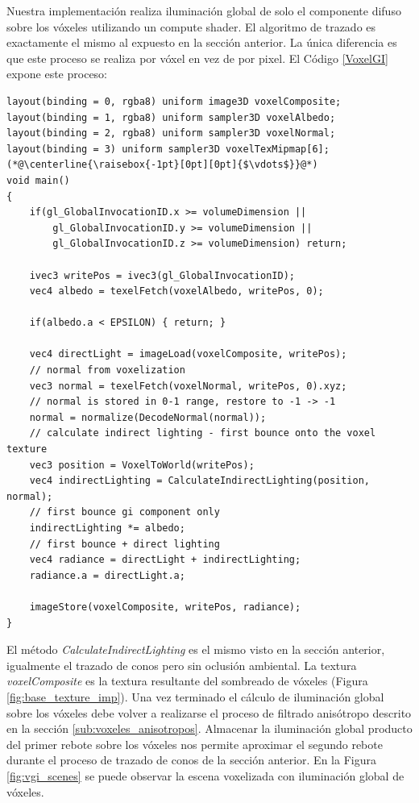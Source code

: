 Nuestra implementación realiza iluminación global de solo el componente difuso sobre los vóxeles utilizando un compute shader. El algoritmo de trazado es exactamente el mismo al expuesto en la sección anterior. La única diferencia es que este proceso se realiza por vóxel en vez de por pixel. El Código \ref{VoxelGI} expone este proceso:
\\
\begin{lstlisting}[caption={Iluminacion global sobre voxeles.}, label=VoxelGI]
layout(binding = 0, rgba8) uniform image3D voxelComposite;
layout(binding = 1, rgba8) uniform sampler3D voxelAlbedo;
layout(binding = 2, rgba8) uniform sampler3D voxelNormal;
layout(binding = 3) uniform sampler3D voxelTexMipmap[6];
(*@\centerline{\raisebox{-1pt}[0pt][0pt]{$\vdots$}}@*)
void main()
{
    if(gl_GlobalInvocationID.x >= volumeDimension ||
        gl_GlobalInvocationID.y >= volumeDimension ||
        gl_GlobalInvocationID.z >= volumeDimension) return;

    ivec3 writePos = ivec3(gl_GlobalInvocationID);
    vec4 albedo = texelFetch(voxelAlbedo, writePos, 0);

    if(albedo.a < EPSILON) { return; }

    vec4 directLight = imageLoad(voxelComposite, writePos);
    // normal from voxelization
    vec3 normal = texelFetch(voxelNormal, writePos, 0).xyz;
    // normal is stored in 0-1 range, restore to -1 -> -1
    normal = normalize(DecodeNormal(normal));
    // calculate indirect lighting - first bounce onto the voxel texture
    vec3 position = VoxelToWorld(writePos);
    vec4 indirectLighting = CalculateIndirectLighting(position, normal);
    // first bounce gi component only
    indirectLighting *= albedo;
    // first bounce + direct lighting
    vec4 radiance = directLight + indirectLighting;
    radiance.a = directLight.a;

    imageStore(voxelComposite, writePos, radiance);
}
\end{lstlisting}
El método \emph{CalculateIndirectLighting} es el mismo visto en la sección anterior, igualmente el trazado de conos pero sin oclusión ambiental. La textura \emph{voxelComposite} es la textura resultante del sombreado de vóxeles (Figura \ref{fig:base_texture_imp}). Una vez terminado el cálculo de iluminación global sobre los vóxeles debe volver a realizarse el proceso de filtrado anisótropo descrito en la sección \ref{sub:voxeles_anisotropos}. Almacenar la iluminación global producto del primer rebote sobre los vóxeles nos permite aproximar el segundo rebote durante el proceso de trazado de conos de la sección anterior. En la Figura \ref{fig:vgi_scenes} se puede observar la escena voxelizada con iluminación global de vóxeles.
